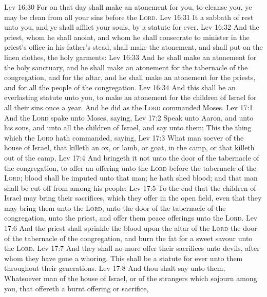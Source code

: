 \vs Lev 16:30 For on that day shall  make an atonement for you, to cleanse you,  ye may be clean from all your sins before the \textsc{Lord}.
\vs Lev 16:31 It  a sabbath of rest unto you, and ye shall afflict your souls, by a statute for ever.
\vs Lev 16:32 And the priest, whom he shall anoint, and whom he shall consecrate to minister in the priest's office in his father's stead, shall make the atonement, and shall put on the linen clothes,  the holy garments:
\vs Lev 16:33 And he shall make an atonement for the holy sanctuary, and he shall make an atonement for the tabernacle of the congregation, and for the altar, and he shall make an atonement for the priests, and for all the people of the congregation.
\vs Lev 16:34 And this shall be an everlasting statute unto you, to make an atonement for the children of Israel for all their sins once a year. And he did as the \textsc{Lord} commanded Moses.
\vs Lev 17:1 And the \textsc{Lord} spake unto Moses, saying,
\vs Lev 17:2 Speak unto Aaron, and unto his sons, and unto all the children of Israel, and say unto them; This  the thing which the \textsc{Lord} hath commanded, saying,
\vs Lev 17:3 What man soever  of the house of Israel, that killeth an ox, or lamb, or goat, in the camp, or that killeth  out of the camp,
\vs Lev 17:4 And bringeth it not unto the door of the tabernacle of the congregation, to offer an offering unto the \textsc{Lord} before the tabernacle of the \textsc{Lord}; blood shall be imputed unto that man; he hath shed blood; and that man shall be cut off from among his people:
\vs Lev 17:5 To the end that the children of Israel may bring their sacrifices, which they offer in the open field, even that they may bring them unto the \textsc{Lord}, unto the door of the tabernacle of the congregation, unto the priest, and offer them  peace offerings unto the \textsc{Lord}.
\vs Lev 17:6 And the priest shall sprinkle the blood upon the altar of the \textsc{Lord}  the door of the tabernacle of the congregation, and burn the fat for a sweet savour unto the \textsc{Lord}.
\vs Lev 17:7 And they shall no more offer their sacrifices unto devils, after whom they have gone a whoring. This shall be a statute for ever unto them throughout their generations.
\vs Lev 17:8 And thou shalt say unto them, Whatsoever man  of the house of Israel, or of the strangers which sojourn among you, that offereth a burnt offering or sacrifice,
